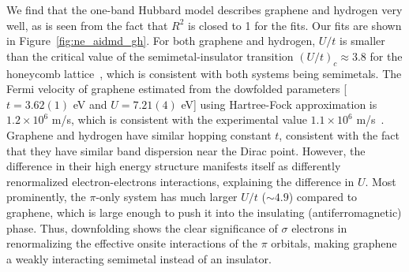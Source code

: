 We find that the one-band Hubbard model describes graphene and hydrogen very well, as is seen from the fact that $R^2$ is closed to 1 for the fits. Our fits are shown in Figure~\ref{fig:ne_aidmd_gh}.
For both graphene and hydrogen, $U/t$ is smaller than the critical value of the 
semimetal-insulator transition $(U/t)_c \approx 3.8$ for the honeycomb lattice~\cite{Sorella2012}, 
which is consistent with both systems being semimetals. The Fermi velocity of graphene estimated from the dowfolded parameters [$t=3.62(1)$ eV and $U=7.21(4)$ eV] using Hartree-Fock approximation is $1.2\times 10^{6}$ m/s, which is consistent with the experimental value $1.1 \times 10^6$ m/s~\cite{Siegel2011}. 
Graphene and hydrogen have similar hopping constant $t$, 
consistent with the fact that they have similar band dispersion near the Dirac point. 
However, the difference in their high energy structure manifests itself as differently renormalized electron-electrons interactions, 
explaining the difference in $U$. Most prominently, the $\pi$-only system has much larger $U/t$ ($\sim4.9$) compared to graphene, 
which is large enough to push it into the insulating (antiferromagnetic) phase.
Thus, downfolding shows the clear significance of $\sigma$ electrons in renormalizing the effective onsite interactions of the $\pi$ orbitals, making graphene a weakly interacting semimetal instead of an insulator.  


